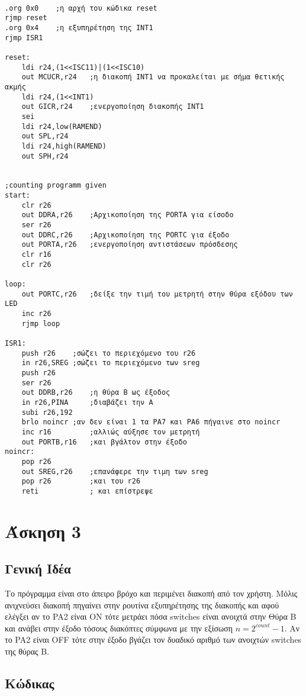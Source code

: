 \documentclass[11pt]{article}
\begin{document}
\begin{verbatim}

.org 0x0	;η αρχή του κώδικα reset
rjmp reset
.org 0x4	;η εξυπηρέτηση της ΙΝΤ1
rjmp ISR1

reset:
	ldi r24,(1<<ISC11)|(1<<ISC10)
	out MCUCR,r24	;η διακοπή ΙΝΤ1 να προκαλείται με σήμα θετικής ακμής
	ldi r24,(1<<INT1)
	out GICR,r24	;ενεργοποίηση διακοπής ΙΝΤ1
	sei
	ldi r24,low(RAMEND)
	out SPL,r24
	ldi r24,high(RAMEND)
	out SPH,r24


;counting programm given
start:
    clr r26
	out DDRA,r26	;Αρχικοποίηση της PORTA για είσοδο
	ser r26
	out DDRC,r26	;Αρχικοποίηση της PORTC για έξοδο
	out PORTA,r26	;ενεργοποίηση αντιστάσεων πρόσδεσης
	clr r16
	clr r26

loop:
	out PORTC,r26	;δείξε την τιμή του μετρητή στην θύρα εξόδου των LED
	inc r26
	rjmp loop

ISR1:
	push r26	;σώζει το περιεχόμενο του r26
	in r26,SREG	;σώζει το περιεχόμενο των sreg
	push r26
	ser r26
	out DDRB,r26	;η θύρα Β ως έξοδος
	in r26,PINA		;διαβάζει την Α
	subi r26,192
	brlo noincr	;αν δεν είναι 1 τα PA7 και PA6 πήγαινε στο noincr
	inc r16			;αλλιώς αύξησε τον μετρητή
	out PORTB,r16	;και βγάλτον στην έξοδο
noincr:
	pop r26		
	out SREG,r26	;επανάφερε την τιμη των sreg 
	pop r26			;και του r26
	reti			; και επίστρεψε

\end{verbatim}

\section*{Άσκηση 3}

\subsection*{Γενική Ιδέα}

Το πρόγραμμα είναι στο άπειρο βρόχο και περιμένει διακοπή από τον χρήστη. Μόλις ανιχνεύσει διακοπή πηγαίνει στην ρουτίνα εξυπηρέτησης της διακοπής και αφού ελέγξει αν το PA2 είναι ON τότε μετράει πόσα switches είναι ανοιχτά στην Θύρα B και ανάβει στην έξοδο τόσους διακόπτες σύμφωνα με την εξίσωση $n = 2^{count} - 1$. Αν το PA2 είναι ΟFF τότε στην έξοδο βγάζει τον δυαδικό αριθμό των ανοιχτών switches της θύρας B.

\subsection*{Κώδικας}
\end{document}
